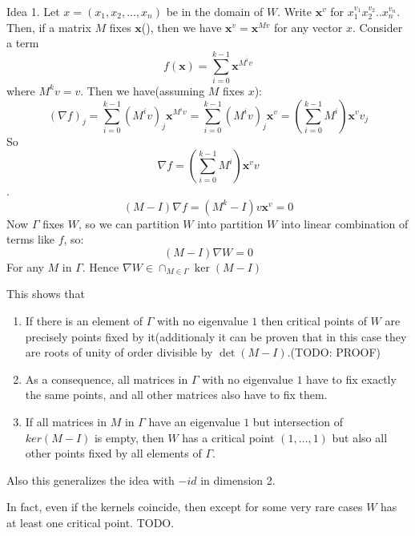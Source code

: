\documentclass[a4paper]{article}
\begin{document}
Idea 1.
Let $x = (x_1, x_2, ..., x_n)$ be in the domain of $W$.
Write $\textbf{x}^v$ for $x_1^{v_1} x_2^{v_2} .. x_n^{v_n}$. Then, if a matrix $M$ fixes $\textbf{x}$(), then we have $\textbf{x}^v = \textbf{x}^{Mv}$ for any vector $x$.
Consider a term 
$$f(\textbf{x}) = \sum_{i=0}^{k-1} \textbf{x}^{M^i v}$$
where $M^k v =v$.
Then we have(assuming $M$ fixes $x$):
$$(\nabla f)_j = \sum_{i=0}^{k-1} (M^i v)_j \textbf{x}^{M^i v} = \sum_{i=0}^{k-1} (M^i v)_j \textbf{x}^{v} = (\sum_{i=0}^{k-1} M^i) \textbf{x}^{v} v_j$$
So $$\nabla f = (\sum_{i=0}^{k-1} M^i) \textbf{x}^{v} v$$.
$$(M-I)\nabla f= (M^k-I)v \textbf{x}^{v}= 0$$
Now $\Gamma$ fixes $W$, so we can partition $W$ into partition $W$ into linear combination of terms like $f$, so:
$$(M-I)\nabla W = 0$$
For any $M$ in $\Gamma$.
Hence $\nabla W \in \cap_{M \in \Gamma} \ker(M - I)$

This shows that 
\begin{enumerate}
	\item If there is an element of $\Gamma$ with no eigenvalue $1$ then critical points of $W$ are precisely points fixed by it(additionaly it can be proven that in this case they are roots of unity of order divisible by $\det(M-I)$.(TODO: PROOF)
	\item As a consequence, all matrices in $\Gamma$ with no eigenvalue $1$ have to fix exactly the same points, and all other matrices also have to fix them.
	\item If all matrices in $M$ in $\Gamma$ have an eigenvalue $1$ but intersection of $ker(M-I)$ is empty, then $W$ has a critical point $(1, \dots,1)$ but also all other points fixed by all elements of $\Gamma$.
\end{enumerate}

Also this generalizes the idea with $-id$ in dimension 2. 

In fact, even if the kernels coincide, then except for some very rare cases $W$ has at least one critical point. TODO.
\end{document}
